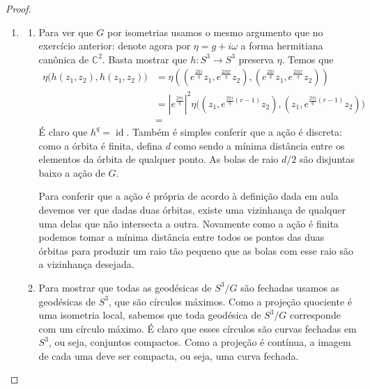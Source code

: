 \begin{proof}\leavevmode
\begin{enumerate}[label=(\alph*)]
\item 
	\begin{enumerate}[label=(\roman*)]
	\item Para ver que \(G\) por isometrias usamos o mesmo argumento que no exercício anterior: denote agora por \(\eta=g+i \omega\) a forma hermitiana canônica de \(\mathbb{C}^2\). Basta mostrar que \(h:S^3 \to S^3\) preserva \(\eta\). Temos que
		\begin{align*}
		\eta\Big(h(z_1,z_2),h(z_1,z_2)\Big)&=\eta\left(\left(e^{\frac{2\pi i}{q}}z_1,e^{\frac{2\pi i r}{q}}z_2\right),\left(e^{\frac{2\pi i}{q}}z_1,e^{\frac{2\pi i r}{q}}z_2\right)\right) \\
		&=\left|e^{\frac{2\pi i}{q}}\right|^2\eta\Big((z_1,e^{\frac{2\pi i}{q}(r-1)}z_2), (z_1,e^{\frac{2\pi i}{q}(r-1)}z_2)\Big)\\
		&=
		\end{align*}
		É claro que \(h^q=\operatorname{id}\). Também é simples conferir que a ação é discreta: como a órbita é finita, defina \(d\) como sendo a mínima distância entre os elementos da órbita de qualquer ponto. As bolas de raio \(d/2\) são disjuntas baixo a ação de  \(G\).

		Para conferir que a ação é própria de acordo à definição dada em aula devemos ver que dadas duas órbitas, existe uma vizinhança de qualquer uma delas que não intersecta a outra. Novamente como a ação é finita podemos tomar a mínima distância entre todos os pontos das duas órbitas para produzir um raio tão pequeno que as bolas com esse raio são a vizinhança desejada.

\item Para mostrar que todas as geodésicas de \(S^3/G\) são fechadas usamos as geodésicas de \(S^3\), que são círculos máximos. Como a projeção quociente é uma isometria local, sabemos que toda geodésica de \(S^3/G\) corresponde com um círculo máximo. É claro que esses círculos são curvas fechadas em \(S^3\), ou seja, conjuntos compactos. Como a projeção é contínua, a imagem de cada uma deve ser compacta, ou seja, uma curva fechada.


\end{enumerate}
\end{enumerate}
\end{proof}
